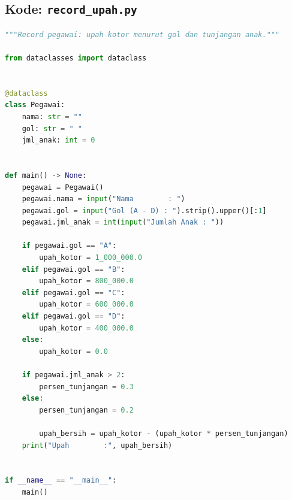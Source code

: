 \documentclass[../main.tex]{subfiles}
\begin{document}
\subsection{Kode: \texttt{record\_upah.py}}
\introstudikasuskode
\begin{lstlisting}[language=Python,caption={\texttt{record\_upah.py}}]
"""Record pegawai: upah kotor menurut gol dan tunjangan anak."""

from dataclasses import dataclass


@dataclass
class Pegawai:
    nama: str = ""
    gol: str = " "
    jml_anak: int = 0


def main() -> None:
    pegawai = Pegawai()
    pegawai.nama = input("Nama        : ")
    pegawai.gol = input("Gol (A - D) : ").strip().upper()[:1]
    pegawai.jml_anak = int(input("Jumlah Anak : "))

    if pegawai.gol == "A":
        upah_kotor = 1_000_000.0
    elif pegawai.gol == "B":
        upah_kotor = 800_000.0
    elif pegawai.gol == "C":
        upah_kotor = 600_000.0
    elif pegawai.gol == "D":
        upah_kotor = 400_000.0
    else:
        upah_kotor = 0.0

    if pegawai.jml_anak > 2:
        persen_tunjangan = 0.3
    else:
        persen_tunjangan = 0.2

        upah_bersih = upah_kotor - (upah_kotor * persen_tunjangan)
    print("Upah        :", upah_bersih)


if __name__ == "__main__":
    main()
\end{lstlisting}
\end{document}
